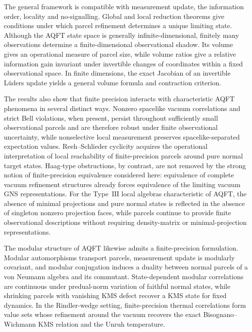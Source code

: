 \documentclass[11pt]{article}
\begin{document}
The general framework is compatible with measurement update, the
information order, locality and no-signalling. Global and local reduction
theorems give conditions under which parcel refinement determines a unique
limiting state. Although the AQFT state space is generally
infinite-dimensional, finitely many observations determine a
finite-dimensional observational shadow. Its volume gives an operational
measure of parcel size, while volume ratios give a relative information
gain invariant under invertible changes of coordinates within a fixed
observational space. In finite dimensions, the exact Jacobian of an
invertible L\"uders update yields a general volume formula and contraction
criterion.

The results also show that finite precision interacts with characteristic
AQFT phenomena in several distinct ways. Nonzero spacelike vacuum
correlations and strict Bell violations, when present, persist throughout
sufficiently small observational parcels and are therefore robust under
finite observational uncertainty, while nonselective local measurement
preserves spacelike-separated expectation values. Reeh--Schlieder cyclicity acquires
the operational interpretation of local reachability of finite-precision
parcels around pure normal target states. Haag-type obstructions, by
contrast, are not removed by the strong notion of finite-precision
equivalence considered here: equivalence of complete vacuum refinement
structures already forces equivalence of the limiting vacuum GNS
representations. For the Type~$\mathrm{III}$ local algebras characteristic
of AQFT, the absence of minimal projections and pure normal states is
reflected in the absence of singleton nonzero projection faces, while
parcels continue to provide finite observational descriptions without
requiring density-matrix or minimal-projection representations.

The modular structure of AQFT likewise admits a finite-precision
formulation. Modular automorphisms transport parcels, measurement update
is modularly covariant, and modular conjugation induces a duality between
normal parcels of a von Neumann algebra and its commutant. State-dependent
modular correlations are continuous under predual-norm variation of
faithful normal states, while shrinking parcels with vanishing KMS defect
recover a KMS state for fixed dynamics. In the Rindler-wedge setting,
finite-precision thermal correlations form value sets whose refinement
around the vacuum recovers the exact Bisognano--Wichmann KMS relation and
the Unruh temperature.
\end{document}
